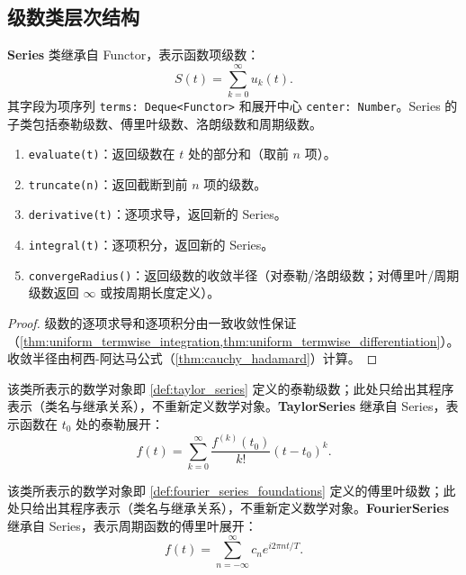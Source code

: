\subsection{级数类层次结构}

\begin{definition}[Series 类]\label{def:series_class}
\textbf{Series} 类继承自 Functor，表示函数项级数：
\[
S(t) = \sum_{k=0}^{\infty} u_k(t).
\]
其字段为项序列 \texttt{terms: Deque<Functor>} 和展开中心 \texttt{center: Number}。Series 的子类包括泰勒级数、傅里叶级数、洛朗级数和周期级数。
\end{definition}

\begin{property}\label{prop:series_class_methods}
\begin{enumerate}[label=(\roman*)]
    \item \texttt{evaluate(t)}：返回级数在 $t$ 处的部分和（取前 $n$ 项）。
    \item \texttt{truncate(n)}：返回截断到前 $n$ 项的级数。
    \item \texttt{derivative(t)}：逐项求导，返回新的 Series。
    \item \texttt{integral(t)}：逐项积分，返回新的 Series。
    \item \texttt{convergeRadius()}：返回级数的收敛半径（对泰勒/洛朗级数；对傅里叶/周期级数返回 $\infty$ 或按周期长度定义）。
\end{enumerate}
\end{property}

\begin{proof}
级数的逐项求导和逐项积分由一致收敛性保证（\cref{thm:uniform_termwise_integration,thm:uniform_termwise_differentiation}）。收敛半径由柯西-阿达马公式（\cref{thm:cauchy_hadamard}）计算。
\end{proof}

\begin{definition}[泰勒级数程序表示]\label{def:taylor_series_class}
该类所表示的数学对象即 \cref{def:taylor_series} 定义的泰勒级数；此处只给出其程序表示（类名与继承关系），不重新定义数学对象。\textbf{TaylorSeries} 继承自 Series，表示函数在 $t_0$ 处的泰勒展开：
\[
f(t) = \sum_{k=0}^{\infty} \frac{f^{(k)}(t_0)}{k!}(t - t_0)^k.
\]
\end{definition}

\begin{definition}[傅里叶级数程序表示]\label{def:fourier_series_class}
该类所表示的数学对象即 \cref{def:fourier_series_foundations} 定义的傅里叶级数；此处只给出其程序表示（类名与继承关系），不重新定义数学对象。\textbf{FourierSeries} 继承自 Series，表示周期函数的傅里叶展开：
\[
f(t) = \sum_{n=-\infty}^{\infty} c_n e^{i 2\pi n t / T}.
\]
\end{definition}

